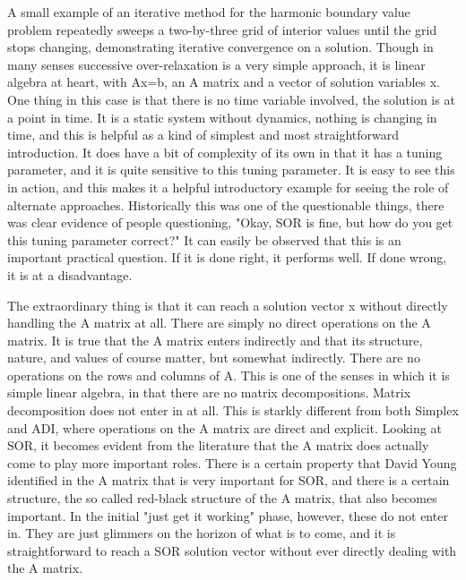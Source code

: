 A small example of an iterative method for the harmonic boundary value problem repeatedly sweeps a two-by-three grid of interior values until the grid stops changing, demonstrating iterative convergence on a solution. Though in many senses successive over-relaxation is a very simple approach, it is linear algebra at heart, with Ax=b, an A matrix and a vector of solution variables x. One thing in this case is that there is no time variable involved, the solution is at a point in time. It is a static system without dynamics, nothing is changing in time, and this is helpful as a kind of simplest and most straightforward introduction. It does have a bit of complexity of its own in that it has a tuning parameter, and it is quite sensitive to this tuning parameter. It is easy to see this in action, and this makes it a helpful introductory example for seeing the role of alternate approaches. Historically this was one of the questionable things, there was clear evidence of people questioning, "Okay, SOR is fine, but how do you get this tuning parameter correct?" It can easily be observed that this is an important practical question. If it is done right, it performs well. If done wrong, it is at a disadvantage. 

The extraordinary thing is that it can reach a solution vector x without directly handling the A matrix at all. There are simply no direct operations on the A matrix. It is true that the A matrix enters indirectly and that its structure, nature, and values of course matter, but somewhat indirectly. There are no operations on the rows and columns of A. This is one of the senses in which it is simple linear algebra, in that there are no matrix decompositions. Matrix decomposition does not enter in at all. This is starkly different from both Simplex and ADI, where operations on the A matrix are direct and explicit. Looking at SOR, it becomes evident from the literature that the A matrix does actually come to play more important roles. There is a certain property that David Young identified in the A matrix that is very important for SOR, and there is a certain structure, the so called red-black structure of the A matrix, that also becomes important. In the initial "just get it working" phase, however, these do not enter in. They are just glimmers on the horizon of what is to come, and it is straightforward to reach a SOR solution vector without ever directly dealing with the A matrix.

